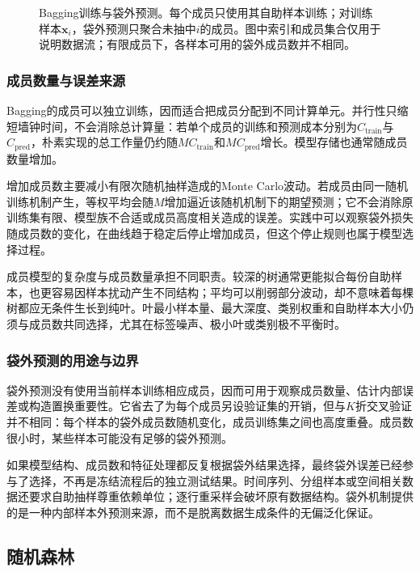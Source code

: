 \begin{figure}[htbp]
  \centering
  
  \caption{Bagging训练与袋外预测。每个成员只使用其自助样本训练；对训练样本$\bm{x}_i$，袋外预测只聚合未抽中$i$的成员。图中索引和成员集合仅用于说明数据流；有限成员下，各样本可用的袋外成员数并不相同。}
  \label{fig:ensemble-bagging-oob}
\end{figure}

\subsubsection{成员数量与误差来源}

Bagging的成员可以独立训练，因而适合把成员分配到不同计算单元。并行性只缩短墙钟时间，不会消除总计算量：若单个成员的训练和预测成本分别为$C_{\mathrm{train}}$与$C_{\mathrm{pred}}$，朴素实现的总工作量仍约随$M C_{\mathrm{train}}$和$M C_{\mathrm{pred}}$增长。模型存储也通常随成员数量增加。

增加成员数主要减小有限次随机抽样造成的Monte Carlo波动。若成员由同一随机训练机制产生，等权平均会随$M$增加逼近该随机机制下的期望预测；它不会消除原训练集有限、模型族不合适或成员高度相关造成的误差。实践中可以观察袋外损失随成员数的变化，在曲线趋于稳定后停止增加成员，但这个停止规则也属于模型选择过程。

成员模型的复杂度与成员数量承担不同职责。较深的树通常更能拟合每份自助样本，也更容易因样本扰动产生不同结构；平均可以削弱部分波动，却不意味着每棵树都应无条件生长到纯叶。叶最小样本量、最大深度、类别权重和自助样本大小仍须与成员数共同选择，尤其在标签噪声、极小叶或类别极不平衡时。

\subsubsection{袋外预测的用途与边界}

袋外预测没有使用当前样本训练相应成员，因而可用于观察成员数量、估计内部误差或构造置换重要性。它省去了为每个成员另设验证集的开销，但与$K$折交叉验证并不相同：每个样本的袋外成员数随机变化，成员训练集之间也高度重叠。成员数很小时，某些样本可能没有足够的袋外预测。

如果模型结构、成员数和特征处理都反复根据袋外结果选择，最终袋外误差已经参与了选择，不再是冻结流程后的独立测试结果。时间序列、分组样本或空间相关数据还要求自助抽样尊重依赖单位；逐行重采样会破坏原有数据结构。袋外机制提供的是一种内部样本外预测来源，而不是脱离数据生成条件的无偏泛化保证。

\subsection{随机森林}
\label{sec:ensemble-random-forest}

